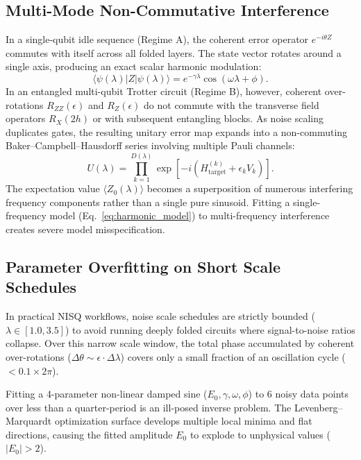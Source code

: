 \subsection{Multi-Mode Non-Commutative Interference}
In a single-qubit idle sequence (Regime A), the coherent error operator $e^{-i \theta Z}$ commutes with itself across all folded layers. The state vector rotates around a single axis, producing an exact scalar harmonic modulation:
\begin{equation}
\langle \psi(\lambda) | Z | \psi(\lambda) \rangle = e^{-\gamma \lambda} \cos(\omega \lambda + \phi).
\end{equation}
In an entangled multi-qubit Trotter circuit (Regime B), however, coherent over-rotations $R_{ZZ}(\epsilon)$ and $R_Z(\epsilon)$ do not commute with the transverse field operators $R_X(2h)$ or with subsequent entangling blocks. As noise scaling duplicates gates, the resulting unitary error map expands into a non-commuting Baker--Campbell--Hausdorff series involving multiple Pauli channels:
\begin{equation}
U(\lambda) = \prod_{k=1}^{D(\lambda)} \exp\left[ -i \left( H_{\mathrm{target}}^{(k)} + \epsilon_k V_k \right) \right].
\end{equation}
The expectation value $\langle Z_0(\lambda) \rangle$ becomes a superposition of numerous interfering frequency components rather than a single pure sinusoid. Fitting a single-frequency model (Eq.~\eqref{eq:harmonic_model}) to multi-frequency interference creates severe model misspecification.

\subsection{Parameter Overfitting on Short Scale Schedules}
In practical NISQ workflows, noise scale schedules are strictly bounded ($\lambda \in [1.0, 3.5]$) to avoid running deeply folded circuits where signal-to-noise ratios collapse. Over this narrow scale window, the total phase accumulated by coherent over-rotations ($\Delta \theta \sim \epsilon \cdot \Delta \lambda$) covers only a small fraction of an oscillation cycle ($< 0.1\times 2\pi$). 

Fitting a 4-parameter non-linear damped sine ($E_0, \gamma, \omega, \phi$) to 6 noisy data points over less than a quarter-period is an ill-posed inverse problem. The Levenberg--Marquardt optimization surface develops multiple local minima and flat directions, causing the fitted amplitude $E_0$ to explode to unphysical values ($|E_0| > 2$).

